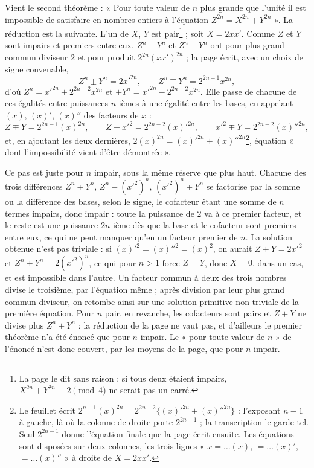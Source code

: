 \documentclass[11pt,a4paper]{article}
\begin{document}
Vient le second théorème : « Pour toute valeur de $n$ plus grande que l'unité il est impossible de satisfaire en nombres entiers à l'équation $Z^{2n}=X^{2n}+Y^{2n}$ ». La réduction est la suivante. L'un de $X$, $Y$ est pair\footnote{La page le dit sans raison ; si tous deux étaient impairs, $X^{2n}+Y^{2n}\equiv 2\pmod 4$ ne serait pas un carré.} ; soit $X=2xx'$. Comme $Z$ et $Y$ sont impairs et premiers entre eux, $Z^n+Y^n$ et $Z^n-Y^n$ ont pour plus grand commun diviseur $2$ et pour produit $2^{2n}(xx')^{2n}$ ; la page écrit, avec un choix de signe convenable,
\[ Z^n\pm Y^n=2x'^{2n},\qquad Z^n\mp Y^n=2^{2n-1}x^{2n}, \]
d'où $Z^n=x'^{2n}+2^{2n-2}x^{2n}$ et $\pm Y^n=x'^{2n}-2^{2n-2}x^{2n}$. Elle passe de chacune de ces égalités entre puissances $n$-ièmes à une égalité entre les bases, en appelant $(x)$, $(x)'$, $(x)''$ des facteurs de $x$ :
\[ Z\mp Y=2^{2n-1}(x)^{2n},\qquad Z-x'^2=2^{2n-2}(x)'^{2n},\qquad x'^2\mp Y=2^{2n-2}(x)''^{2n}, \]
et, en ajoutant les deux dernières, $2(x)^{2n}=(x)'^{2n}+(x)''^{2n}$\footnote{Le feuillet écrit $2^{n-1}(x)^{2n}=2^{2n-2}\{(x)'^{2n}+(x)''^{2n}\}$ : l'exposant $n-1$ à gauche, là où la colonne de droite porte $2^{2n-1}$ ; la transcription le garde tel. Seul $2^{2n-1}$ donne l'équation finale que la page écrit ensuite. Les équations sont disposées sur deux colonnes, les trois lignes « $x=\dots(x)$, $=\dots(x)'$, $=\dots(x)''$ » à droite de $X=2xx'$.}, équation « dont l'impossibilité vient d'être démontrée ».

Ce pas est juste pour $n$ impair, sous la même réserve que plus haut. Chacune des trois différences $Z^n\mp Y^n$, $Z^n-(x'^2)^n$, $(x'^2)^n\mp Y^n$ se factorise par la somme ou la différence des bases, selon le signe, le cofacteur étant une somme de $n$ termes impairs, donc impair : toute la puissance de $2$ va à ce premier facteur, et le reste est une puissance $2n$-ième dès que la base et le cofacteur sont premiers entre eux, ce qui ne peut manquer qu'en un facteur premier de $n$. La solution obtenue n'est pas triviale : si $(x)'^2=(x)''^2=(x)^2$, on aurait $Z\pm Y=2x'^2$ et $Z^n\pm Y^n=2(x'^2)^n$, ce qui pour $n>1$ force $Z=Y$, donc $X=0$, dans un cas, et est impossible dans l'autre. Un facteur commun à deux des trois nombres divise le troisième, par l'équation même ; après division par leur plus grand commun diviseur, on retombe ainsi sur une solution primitive non triviale de la première équation. Pour $n$ pair, en revanche, les cofacteurs sont pairs et $Z+Y$ ne divise plus $Z^n+Y^n$ : la réduction de la page ne vaut pas, et d'ailleurs le premier théorème n'a été énoncé que pour $n$ impair. Le « pour toute valeur de $n$ » de l'énoncé n'est donc couvert, par les moyens de la page, que pour $n$ impair.
\end{document}
